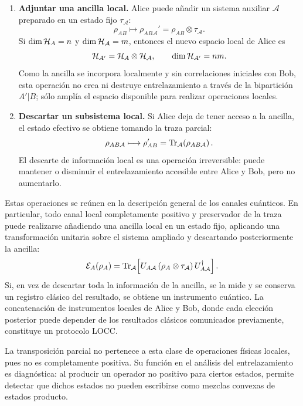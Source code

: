 \documentclass[../main.tex]{subfiles}
\begin{document}
\begin{enumerate}
    \item \textbf{Adjuntar una ancilla local.} Alice puede añadir un sistema auxiliar $\mathcal{A}$ preparado en un estado fijo $\tau_{\mathcal{A}}$:
    \begin{equation*}
        \rho_{AB}
        \longmapsto
        \rho_{AB\mathcal{A}}'
        =\rho_{AB}\otimes\tau_{\mathcal{A}}.
    \end{equation*}
    Si $\dim\mathcal{H}_A=n$ y $\dim\mathcal{H}_{\mathcal{A}}=m$, entonces el nuevo espacio local de Alice es
    \begin{equation*}
        \mathcal{H}_{A'}=\mathcal{H}_A\otimes\mathcal{H}_{\mathcal{A}},
        \qquad
        \dim\mathcal{H}_{A'}=nm.
    \end{equation*}
    Como la ancilla se incorpora localmente y sin correlaciones iniciales con Bob, esta operación no crea ni destruye entrelazamiento a través de la bipartición $A'|B$; sólo amplía el espacio disponible para realizar operaciones locales.

    \item \textbf{Descartar un subsistema local.} Si Alice deja de tener acceso a la ancilla, el estado efectivo se obtiene tomando la traza parcial:
    \begin{equation*}
        \rho_{AB\mathcal{A}}
        \longmapsto
        \rho'_{AB}
        =\Tr_{\mathcal{A}}\!\left(\rho_{AB\mathcal{A}}\right).
    \end{equation*}
    El descarte de información local es una operación irreversible: puede mantener o disminuir el entrelazamiento accesible entre Alice y Bob, pero no aumentarlo.
\end{enumerate}

Estas operaciones se reúnen en la descripción general de los canales cuánticos. En particular, todo canal local completamente positivo y preservador de la traza puede realizarse añadiendo una ancilla local en un estado fijo, aplicando una transformación unitaria sobre el sistema ampliado y descartando posteriormente la ancilla:
\begin{equation*}
    \mathcal{E}_A(\rho_A)
    =\Tr_{\mathcal{A}}\!\left[
        U_{A\mathcal{A}}
        \left(\rho_A\otimes\tau_{\mathcal{A}}\right)
        U_{A\mathcal{A}}^{\dagger}
    \right].
\end{equation*}
Si, en vez de descartar toda la información de la ancilla, se la mide y se conserva un registro clásico del resultado, se obtiene un instrumento cuántico. La concatenación de instrumentos locales de Alice y Bob, donde cada elección posterior puede depender de los resultados clásicos comunicados previamente, constituye un protocolo LOCC.

\begin{observacion}
La transposición parcial no pertenece a esta clase de operaciones físicas locales, pues no es completamente positiva. Su función en el análisis del entrelazamiento es diagnóstica: al producir un operador no positivo para ciertos estados, permite detectar que dichos estados no pueden escribirse como mezclas convexas de estados producto.
\end{observacion}

\end{document}
